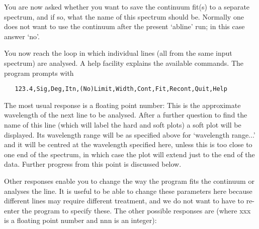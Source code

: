   You are now asked whether you want to save the continuum fit(s) to a
   separate spectrum, and if so, what the name of this spectrum should
   be. Normally one does not want to use the continuum after the present
   `abline' run; in this case answer `no'.

   You now reach the loop in which individual lines (all from the same
   input spectrum) are analysed. A help facility explains the available
   commands. The program prompts with

\begin{verbatim}
   123.4,Sig,Deg,Itn,(No)Limit,Width,Cont,Fit,Recont,Quit,Help
\end{verbatim}

   The most usual response is a floating point number: This is the
   approximate wavelength of the next line to be analysed. After a
   further question to find the name of this line (which will label the
   hard and soft plots) a soft plot will be displayed. Its wavelength
   range will be as specified above for `wavelength range...' and it
   will be centred at the wavelength specified here, unless this is too
   close to one end of the spectrum, in which case the plot will extend
   just to the end of the data. Further progress from this point is
   discussed below.

   Other responses enable you to change the way the program fits the
   continuum or analyses the line. It is useful to be able to change
   these parameters here because different lines may require different
   treatment, and we do not want to have to re-enter the program to
   specify these. The other possible responses are (where xxx is a
   floating point number and nnn is an integer):

